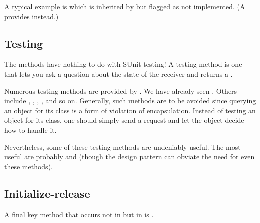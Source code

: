 \documentclass[a4paper,10pt,twoside]{book}
\begin{document}
A typical example is  which is inherited by  but flagged as not implemented.
(A  provides  instead.)



\subsection{Testing}

The  methods have nothing to do with SUnit testing!
A testing method is one that lets you ask a question about the state of the receiver and returns a .

Numerous testing methods are provided by .
We have already seen .
Others include , , , , and so on.
Generally, such methods are to be avoided since querying an object for its class is a form of violation of encapsulation.
Instead of testing an object for its class, one should simply send a request and let the object decide how to handle it.

Nevertheless, some of these testing methods are undeniably useful.
The most useful are probably  and  (though the \cite{Wool98a} design pattern can obviate the need for even these methods).


\subsection{Initialize-release}

A final key method that occurs not in  but in  is .
\end{document}
